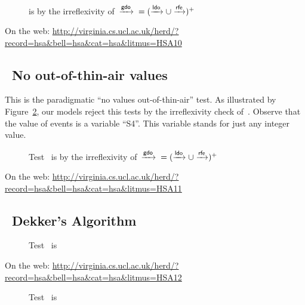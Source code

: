 \documentclass[a4paper]{article}
\begin{document}
\begin{figure}[htp]
\begin{center}\moveback{}
\end{center}
\caption{\label{hsa10}  is {\color{red}{forbidden}} by the
irreflexivity of~$\xrightarrow{\textsf{\scriptsize{}gdo}}{} = (\xrightarrow{\textsf{\scriptsize{}ldo}} \cup \xrightarrow{\textsf{\scriptsize{}rfe}})^{+}$}
\end{figure}

On the web:
\url{http://virginia.cs.ucl.ac.uk/herd/?record=hsa&bell=hsa&cat=hsa&litmus=HSA10}

\pagebreak

\subsection{~No out-of-thin-air values}


This is the paradigmatic ``no values out-of-thin-air'' test.
As illustrated by Figure~\ref{hsa11}, our models reject this
tests by the irreflexivity check of~\gdo{}.
Observe that the value of events is a variable ``\textsf{S4}''.
This variable stands for just any integer value.

\begin{figure}[htp]
\begin{center}\moveback{}
\end{center}
\caption{\label{hsa11} Test~ is {\color{red}{forbidden}} by the
irreflexivity of~$\xrightarrow{\textsf{\scriptsize{}gdo}}{} = (\xrightarrow{\textsf{\scriptsize{}ldo}} \cup \xrightarrow{\textsf{\scriptsize{}rfe}})^{+}$}
\end{figure}

On the web:
\url{http://virginia.cs.ucl.ac.uk/herd/?record=hsa&bell=hsa&cat=hsa&litmus=HSA11}

\pagebreak

\subsection{\label{ex12}~Dekker's Algorithm}



\begin{figure}[htp]
\begin{center}\moveback{}
\end{center}
\caption{\label{hsa12} Test~ is \color{green}{allowed}}
\end{figure}

On the web:
\url{http://virginia.cs.ucl.ac.uk/herd/?record=hsa&bell=hsa&cat=hsa&litmus=HSA12}

\begin{figure}[htp]
\begin{center}\moveback{}
\end{center}
\caption{\label{hsa12fences} Test~ is \color{green}{allowed}}
\end{figure}
\end{document}
